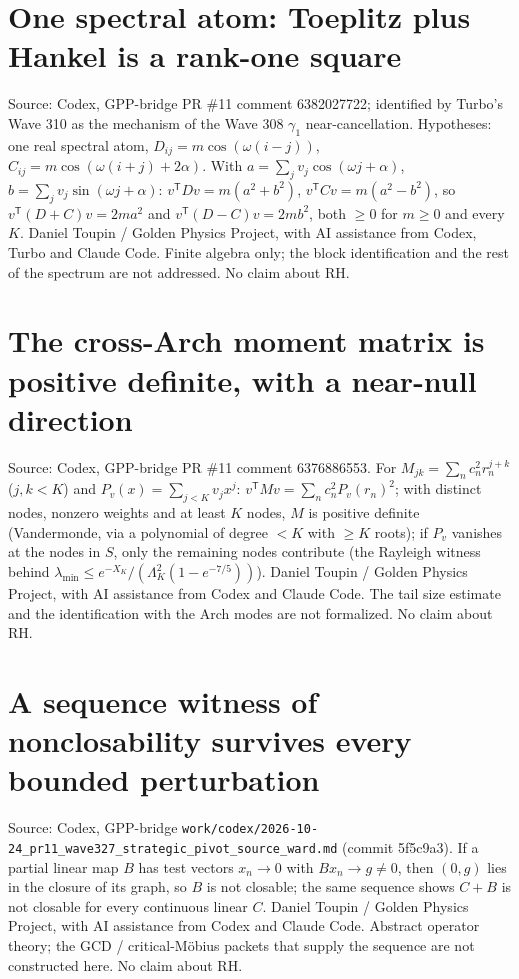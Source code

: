 \documentclass{report}
\theoremstyle{definition}
\begin{document}
\begin{itemize}
\begin{itemize}
\section{One spectral atom: Toeplitz plus Hankel is a rank-one square}
Source: Codex, GPP-bridge PR \#11 comment 6382027722; identified by Turbo's Wave 310 as the mechanism of the Wave 308 $\gamma_1$ near-cancellation. Hypotheses: one real
spectral atom, $D_{ij}=m\cos(\omega(i-j))$, $C_{ij}=m\cos(\omega(i+j)+2\alpha)$. With $a=\sum_jv_j\cos(\omega j+\alpha)$, $b=\sum_jv_j\sin(\omega j+\alpha)$:
$v^{\mathsf T}Dv=m(a^2+b^2)$, $v^{\mathsf T}Cv=m(a^2-b^2)$, so $v^{\mathsf T}(D+C)v=2ma^2$ and $v^{\mathsf T}(D-C)v=2mb^2$, both $\ge0$ for $m\ge0$ and every $K$. Daniel Toupin /
Golden Physics Project, with AI assistance from Codex, Turbo and Claude Code. Finite algebra only; the block identification and the rest of the spectrum are not
addressed. No claim about RH.

\section{The cross-Arch moment matrix is positive definite, with a near-null direction}
Source: Codex, GPP-bridge PR \#11 comment 6376886553. For $M_{jk}=\sum_nc_n^2r_n^{j+k}$ ($j,k<K$) and $P_v(x)=\sum_{j<K}v_jx^j$: $v^{\mathsf T}Mv=\sum_nc_n^2P_v(r_n)^2$; with distinct
nodes, nonzero weights and at least $K$ nodes, $M$ is positive definite (Vandermonde, via a polynomial of degree $<K$ with $\ge K$ roots); if $P_v$ vanishes at the
nodes in $S$, only the remaining nodes contribute (the Rayleigh witness behind $\lambda_{\min}\le e^{-X_K}/(\Lambda_K^2(1-e^{-7/5}))$). Daniel Toupin / Golden Physics
Project, with AI assistance from Codex and Claude Code. The tail size estimate and the identification with the Arch modes are not formalized. No claim about RH.

\section{A sequence witness of nonclosability survives every bounded perturbation}
Source: Codex, GPP-bridge \texttt{work/codex/2026-10-24\_pr11\_wave327\_strategic\_pivot\_source\_ward.md} (commit 5f5c9a3). If a partial linear map $B$ has test vectors
$x_n\to0$ with $Bx_n\to g\ne0$, then $(0,g)$ lies in the closure of its graph, so $B$ is not closable; the same sequence shows $C+B$ is not closable for every continuous
linear $C$. Daniel Toupin / Golden Physics Project, with AI assistance from Codex and Claude Code. Abstract operator theory; the GCD / critical-M\"obius packets that
supply the sequence are not constructed here. No claim about RH.


\end{itemize}
\end{itemize}
\end{document}
